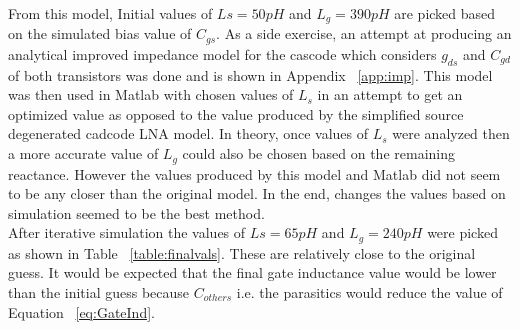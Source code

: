 \documentclass{article}                                                         %
\begin{document}
From this model, Initial values of $Ls = 50pH$ and $L_g = 390pH$ are picked based on the simulated bias value of $C_{gs}$.
As a side exercise, an attempt at producing an analytical improved impedance model for the cascode which considers $g_{ds}$
and $C_{gd}$ of both transistors was done and is shown in Appendix ~\ref{app:imp}.
This model was then used in Matlab with chosen values of $L_s$ in an attempt to get an optimized value as opposed to the value produced
by the simplified source degenerated cadcode LNA model. In theory, once values of $L_s$ were analyzed then a more accurate value of $L_g$ could
also be chosen based on the remaining reactance. However the values produced by this model and Matlab did not seem to be any closer
than the original model. In the end, changes the values based on simulation seemed to be the best method.\\

After iterative simulation the values of $Ls = 65pH$ and $L_g = 240pH$ were picked as shown in Table ~\ref{table:finalvals}.
These are relatively close to the original guess. It would be expected that the final gate inductance value would be lower than
the initial guess because $C_{others}$ i.e. the parasitics would reduce the value of Equation ~\ref{eq:GateInd}.
\end{document}
